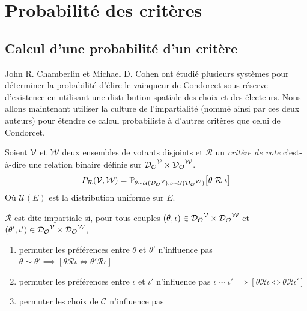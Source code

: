 
\section{Probabilité des critères}

\subsection{Calcul d'une probabilité d'un critère}

John R. Chamberlin et Michael D. Cohen \cite{spatial_model} ont étudié plusieurs systèmes pour déterminer la probabilité d'élire le vainqueur de Condorcet sous réserve d'existence en utilisant une distribution spatiale des choix et des électeurs. Nous allons maintenant utiliser la culture de l'impartialité (nommé ainsi par ces deux auteurs) pour étendre ce calcul probabiliste à d'autres critères que celui de Condorcet.

\begin{definition}
	Soient $\mathcal{V}$ et $\mathcal{W}$ deux ensembles de votants disjoints et $\mathcal{R}$ un \textit{critère de vote} c'est-à-dire une relation binaire définie sur ${\mathcal{D}_\mathcal{O}}^{\mathcal{V}} \times {\mathcal{D}_\mathcal{O}}^{\mathcal{W}}$.
	\begin{equation}
		P_\mathcal{R} (\mathcal{V}, \mathcal{W})
		= \mathbb{P}_{\theta \sim \mathcal{U}({\mathcal{D}_\mathcal{O}}^{\mathcal{V}}), \iota \sim \mathcal{U}({\mathcal{D}_\mathcal{O}}^{\mathcal{W}})}
		\big[ \theta \; \mathcal{R} \; \iota \big]
	\end{equation}
	Où $\mathcal{U}(E)$ est la distribution uniforme sur  $E$. \\
\end{definition}

\noindent $\mathcal{R}$ est dite impartiale si, pour tous couples $(\theta, \iota) \in {\mathcal{D}_\mathcal{O}}^{\mathcal{V}} \times {\mathcal{D}_\mathcal{O}}^{\mathcal{W}}$ et $(\theta', \iota') \in {\mathcal{D}_\mathcal{O}}^{\mathcal{V}} \times {\mathcal{D}_\mathcal{O}}^{\mathcal{W}}$,
\begin{enumerate}[label=$(\roman*)$]
	\item permuter les préférences entre $\theta$ et $\theta'$ n'influence pas $\theta \sim \theta' \implies \left[ \theta \mathcal{R} \iota \iff \theta' \mathcal{R} \iota \right]$
	\item permuter les préférences entre $\iota$ et $\iota'$ n'influence pas $\iota \sim \iota' \implies \left[ \theta \mathcal{R} \iota \iff \theta \mathcal{R} \iota' \right]$
	\item permuter les choix de $\mathcal{C}$ n'influence pas
\end{enumerate}

